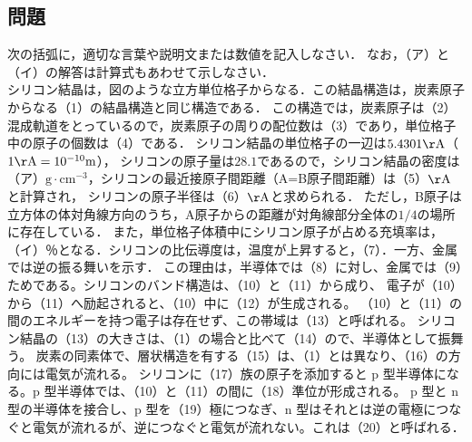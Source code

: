 \documentclass[dvipdfmx]{article}
\begin{document}
  \subsection*{問題} %
  次の括弧に，適切な言葉や説明文または数値を記入しなさい． なお，（ア）と（イ）の解答は計算式もあわせて示しなさい．\\
  シリコン結晶は，図のような立方単位格子からなる．この結晶構造は，炭素原子からなる（1）の結晶構造と同じ構造である．
  この構造では，炭素原子は（2）混成軌道をとっているので，炭素原子の周りの配位数は（3）であり，単位格子中の原子の個数は（4）である．
  シリコン結晶の単位格子の一辺は$ 5.4301\mathrm{\AA}$（$1 \mathrm{\AA}=10^{-10}\mathrm{m}$），
  シリコンの原子量は$28.1$であるので，シリコン結晶の密度は（ア）$\mathrm{g \cdot cm^{-3}}$，シリコンの最近接原子間距離（A=B原子間距離）は（5）$\mathrm{\AA}$ と計算され，
  シリコンの原子半径は（6）$\mathrm{\AA}$と求められる．
  ただし，B原子は立方体の体対角線方向のうち，A原子からの距離が対角線部分全体の$1/4$の場所に存在している．
  また，単位格子体積中にシリコン原子が占める充填率は，（イ）％となる．シリコンの比伝導度は，温度が上昇すると，（7）．一方、金属では逆の振る舞いを示す．
  この理由は，半導体では（8）に対し、金属では（9）ためである。シリコンのバンド構造は、（10）と（11）から成り、
  電子が（10）から（11）へ励起されると、（10）中に（12）が生成される。
  （10）と（11）の間のエネルギーを持つ電子は存在せず、この帯域は（13）と呼ばれる。
  シリコン結晶の（13）の大きさは、（1）の場合と比べて（14）ので、半導体として振舞う。
  炭素の同素体で、層状構造を有する（15）は、（1）とは異なり、（16）の方向には電気が流れる。
  シリコンに（17）族の原子を添加すると p 型半導体になる。p 型半導体では、（10）と（11）の間に（18）準位が形成される。
  p 型と n 型の半導体を接合し、p 型を（19）極につなぎ、n 型はそれとは逆の電極につなぐと電気が流れるが、逆につなぐと電気が流れない。これは（20）と呼ばれる．
\end{document}

